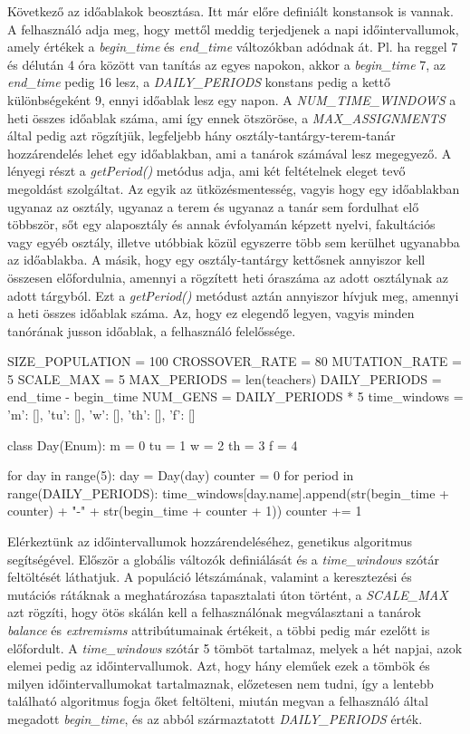 \documentclass[a4paper,12pt]{article}
\begin{document}
Következő az időablakok beosztása. Itt már előre definiált konstansok is vannak. A felhasználó adja meg, hogy mettől meddig terjedjenek a napi időintervallumok, amely értékek a \textsl{begin_time} és \textsl{end_time} változókban adódnak át. Pl. ha reggel 7 és délután 4 óra között van tanítás az egyes napokon, akkor a \textsl{begin_time} 7, az \textsl{end_time} pedig 16 lesz, a \textsl{DAILY_PERIODS} konstans pedig a kettő különbségeként 9, ennyi időablak lesz egy napon. A \textsl{NUM_TIME_WINDOWS} a heti összes időablak száma, ami így ennek ötszöröse, a \textsl{MAX_ASSIGNMENTS} által pedig azt rögzítjük, legfeljebb hány osztály-tantárgy-terem-tanár hozzárendelés lehet egy időablakban, ami a tanárok számával lesz megegyező. A lényegi részt a \textsl{getPeriod()} metódus adja, ami két feltételnek eleget tevő megoldást szolgáltat. Az egyik az ütközésmentesség, vagyis hogy egy időablakban ugyanaz az osztály, ugyanaz a terem és ugyanaz a tanár sem fordulhat elő többször, sőt egy alaposztály és annak évfolyamán képzett nyelvi, fakultációs vagy egyéb osztály, illetve utóbbiak közül egyszerre több sem kerülhet ugyanabba az időablakba. A másik, hogy egy osztály-tantárgy kettősnek annyiszor kell összesen előfordulnia, amennyi a rögzített heti óraszáma az adott osztálynak az adott tárgyból. Ezt a \textsl{getPeriod()} metódust aztán annyiszor hívjuk meg, amennyi a heti összes időablak száma. Az, hogy ez elegendő legyen, vagyis minden tanórának jusson időablak, a felhasználó felelőssége.

\begin{python}
SIZE_POPULATION = 100
CROSSOVER_RATE = 80
MUTATION_RATE = 5
SCALE_MAX = 5
MAX_PERIODS = len(teachers)
DAILY_PERIODS = end_time - begin_time
NUM_GENS = DAILY_PERIODS * 5
time_windows = {'m': [], 'tu': [], 'w': [], 'th': [], 'f': []}


class Day(Enum):
    m = 0
    tu = 1
    w = 2
    th = 3
    f = 4


for day in range(5):
    day = Day(day)
    counter = 0
    for period in range(DAILY_PERIODS):
        time_windows[day.name].append(str(begin_time + counter) + "-" + str(begin_time + counter + 1))
        counter += 1
\end{python}

Elérkeztünk az időintervallumok hozzárendeléséhez, genetikus algoritmus segítségével. Először a globális változók definiálását és a \textsl{time_windows} szótár feltöltését láthatjuk. A populáció létszámának, valamint a keresztezési és mutációs rátáknak a meghatározása tapasztalati úton történt, a \textsl{SCALE_MAX} azt rögzíti, hogy ötös skálán kell a felhasználónak megválasztani a tanárok \textsl{balance} és \textsl{extremisms} attribútumainak értékeit, a többi pedig már ezelőtt is előfordult. A \textsl{time_windows} szótár 5 tömböt tartalmaz, melyek a hét napjai, azok elemei pedig az időintervallumok. Azt, hogy hány eleműek ezek a tömbök és milyen időintervallumokat tartalmaznak, előzetesen nem tudni, így a lentebb található algoritmus fogja őket feltölteni, miután megvan a felhasználó által megadott \textsl{begin_time}, és az abból származtatott \textsl{DAILY_PERIODS} érték.
\end{document}
